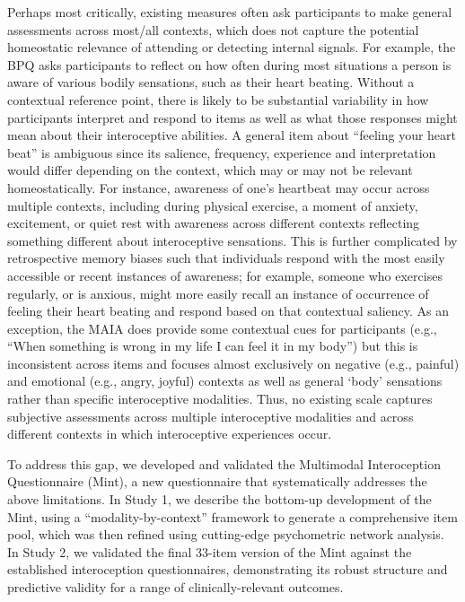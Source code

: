 \documentclass[
  jou,
  floatsintext,
  longtable,
  nolmodern,
  notxfonts,
  notimes,
  colorlinks=true,linkcolor=blue,citecolor=blue,urlcolor=blue]{apa7}
\begin{document}
Perhaps most critically, existing measures often ask participants to
make general assessments across most/all contexts, which does not
capture the potential homeostatic relevance of attending or detecting
internal signals. For example, the BPQ asks participants to reflect on
how often during most situations a person is aware of various bodily
sensations, such as their heart beating. Without a contextual reference
point, there is likely to be substantial variability in how participants
interpret and respond to items as well as what those responses might
mean about their interoceptive abilities. A general item about ``feeling
your heart beat'' is ambiguous since its salience, frequency, experience
and interpretation would differ depending on the context, which may or
may not be relevant homeostatically. For instance, awareness of one's
heartbeat may occur across multiple contexts, including during physical
exercise, a moment of anxiety, excitement, or quiet rest with awareness
across different contexts reflecting something different about
interoceptive sensations. This is further complicated by retrospective
memory biases such that individuals respond with the most easily
accessible or recent instances of awareness; for example, someone who
exercises regularly, or is anxious, might more easily recall an instance
of occurrence of feeling their heart beating and respond based on that
contextual saliency. As an exception, the MAIA does provide some
contextual cues for participants (e.g., ``When something is wrong in my
life I can feel it in my body'') but this is inconsistent across items
and focuses almost exclusively on negative (e.g., painful) and emotional
(e.g., angry, joyful) contexts as well as general `body' sensations
rather than specific interoceptive modalities. Thus, no existing scale
captures subjective assessments across multiple interoceptive modalities
and across different contexts in which interoceptive experiences occur.

To address this gap, we developed and validated the Multimodal
Interoception Questionnaire (Mint), a new questionnaire that
systematically addresses the above limitations. In Study 1, we describe
the bottom-up development of the Mint, using a ``modality-by-context''
framework to generate a comprehensive item pool, which was then refined
using cutting-edge psychometric network analysis. In Study 2, we
validated the final 33-item version of the Mint against the established
interoception questionnaires, demonstrating its robust structure and
predictive validity for a range of clinically-relevant outcomes.
\end{document}
